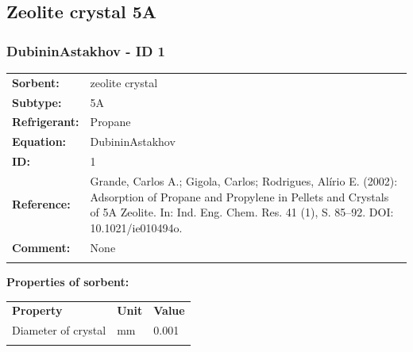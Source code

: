\subsection{Zeolite crystal 5A}
%
\subsubsection{DubininAstakhov - ID 1}
%
\begin{tabular}[l]{|lp{11.5cm}|}
\hline
\addlinespace

\textbf{Sorbent:} & zeolite crystal \\
\textbf{Subtype:} & 5A \\
\textbf{Refrigerant:} & Propane \\
\textbf{Equation:} & DubininAstakhov \\
\textbf{ID:} & 1 \\
\textbf{Reference:} & Grande, Carlos A.; Gigola, Carlos; Rodrigues, Alírio E. (2002): Adsorption of Propane and Propylene in Pellets and Crystals of 5A Zeolite. In: Ind. Eng. Chem. Res. 41 (1), S. 85–92. DOI: 10.1021/ie010494o. \\
\textbf{Comment:} & None \\

\addlinespace
\hline
\end{tabular}
\newline

\textbf{Properties of sorbent:}
\newline
%
\begin{longtable}[l]{lll}
\toprule
\addlinespace
\textbf{Property} & \textbf{Unit} & \textbf{Value} \\
\addlinespace
\midrule
\endhead
\bottomrule
\endfoot
\bottomrule
\endlastfoot
\addlinespace

Diameter of crystal & \si{\milli\meter} & 0.001\\

\addlinespace\end{longtable}

